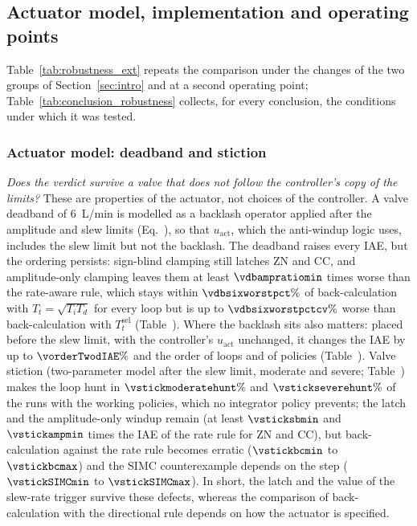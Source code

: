 \subsection{Actuator model, implementation and operating points}
\label{subsec:robustness_ext}
Table~\ref{tab:robustness_ext} repeats the comparison under the changes of the two groups of Section~\ref{sec:intro} and at a second operating point; Table~\ref{tab:conclusion_robustness} collects, for every conclusion, the conditions under which it was tested.

\subsubsection{Actuator model: deadband and stiction}
\label{subsubsec:actuator_model}
\emph{Does the verdict survive a valve that does not follow the controller's copy of the limits?} These are properties of the actuator, not choices of the controller. A valve deadband of $6$~L/min is modelled as a backlash operator applied after the amplitude and slew limits (Eq.~), so that $u_{\text{act}}$, which the anti-windup logic uses, includes the slew limit but not the backlash. The deadband raises every IAE, but the ordering persists: sign-blind clamping still latches ZN and CC, and amplitude-only clamping leaves them at least $\vdbampratiomin$ times worse than the rate-aware rule, which stays within $\vdbsixworstpct\%$ of back-calculation with $T_t = \sqrt{T_iT_d}$ for every loop but is up to $\vdbsixworstpctcv\%$ worse than back-calculation with $T_t^{\mathrm{sel}}$ (Table~). Where the backlash sits also matters: placed before the slew limit, with the controller's $u_{\text{act}}$ unchanged, it changes the IAE by up to $\vorderTwodIAE\%$ and the order of loops and of policies (Table~). Valve stiction (two-parameter model \cite{choudhury2005modelling} after the slew limit, moderate and severe; Table~) makes the loop hunt in $\vstickmoderatehunt\%$ and $\vstickseverehunt\%$ of the runs with the working policies, which no integrator policy prevents; the latch and the amplitude-only windup remain (at least $\vsticksbmin$ and $\vstickampmin$ times the IAE of the rate rule for ZN and CC), but back-calculation against the rate rule becomes erratic ($\vstickbcmin$ to $\vstickbcmax$) and the SIMC counterexample depends on the step ($\vstickSIMCmin$ to $\vstickSIMCmax$). In short, the latch and the value of the slew-rate trigger survive these defects, whereas the comparison of back-calculation with the directional rule depends on how the actuator is specified.


